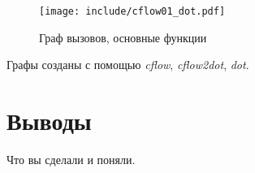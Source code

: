 \documentclass[a4paper,12pt]{report}
\begin{document}
\begin{figure}
\centering
\texttt{[image: include/cflow01\_dot.pdf]}
\caption{Граф вызовов, основные функции}
\label{fig:cflow01}
\end{figure}

Графы созданы с помощью \textit{cflow}, \textit{cflow2dot}, \textit{dot}.

\chapter*{Выводы}

Что вы сделали и поняли.
\end{document}
